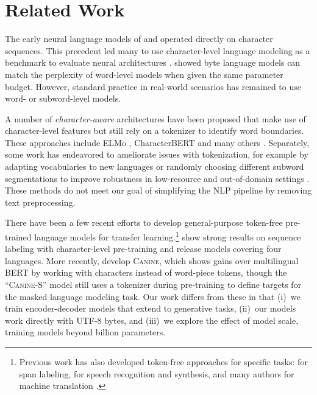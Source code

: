 \documentclass[11pt,a4paper]{article}
\begin{document}
\section{Related Work}
\label{sec:related-work}

The early neural language models of \citet{sutskever-2011-generating} and \citet{graves-2013-generating} operated directly on character sequences. This precedent led many to use character-level language modeling as a benchmark to evaluate neural architectures \cite{kalchbrenner-2016-bytenet, chung-2017-hierarchical, ha-2017-hypernets, zilly-2017-recurrent-highway-nets, melis-2018-sota-eval, al-rfou-2019-character-lm}. \citet{Choe2019BridgingTG} showed byte language models can match the perplexity of word-level models when given the same parameter budget. However, standard practice in real-world scenarios has remained to use word- or subword-level models.

A number of \textit{character-aware} architectures have been proposed that make use of character-level features but still rely on a tokenizer to identify word boundaries. These approaches include ELMo \cite{peters-etal-2018-deep}, CharacterBERT \cite{el-boukkouri-etal-2020-characterbert} and many others \cite{ling-2015-character, chung-etal-2016-character, kim-2016-character-aware, rafal-2016-exploring, wang-2020-nmt-with-byte, wei-2021-training}.
Separately, some work has endeavored to ameliorate issues with tokenization, for example by adapting vocabularies to new languages \cite{garcia-2021-continual} or randomly choosing different subword segmentations to improve robustness in low-resource and out-of-domain settings \cite{kudo-2018-subword}.
These methods do not meet our goal of simplifying the NLP pipeline by removing text preprocessing.

There have been a few recent efforts to develop general-purpose token-free pre-trained language models for transfer learning.\footnote{Previous work has also developed token-free approaches for specific tasks: \citet{gillick-etal-2016-multilingual} for span labeling, \citet{li-2019-bytes} for speech recognition and synthesis, and many authors for machine translation \cite{lee-etal-2017-fully, costa-jussa-etal-2017-byte, cherry-etal-2018-revisiting, shaham-levy-2021-neural}.}
\citet{akbik-etal-2018-contextual} show strong results on sequence labeling with character-level pre-training and release models covering four languages. More recently, \citet{clark2021canine} develop \textsc{Canine}, which shows gains over multilingual BERT by working with characters instead of word-piece tokens, though the ``\textsc{Canine}-S'' model still uses a tokenizer during pre-training to define targets for the masked language modeling task. Our work differs from these in that (i)~we train encoder-decoder models that extend to generative tasks, (ii)~our models work directly with UTF-8 bytes, and (iii)~we explore the effect of model scale, training models beyond  billion parameters.
\end{document}
